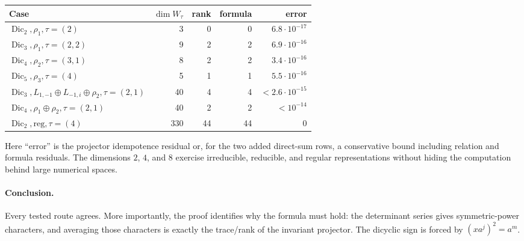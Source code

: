 \documentclass[11pt]{article}
\newcommand{\Dic}{\operatorname{Dic}}
\begin{document}
\begin{center}
\small
\begin{tabular}{@{}lrrrr@{}}
\toprule
Case & $\dim W_\tau$ & rank & formula & error\\
\midrule
$\Dic_2,\rho_1,\tau=(2)$ & 3 & 0 & 0 & $6.8\cdot10^{-17}$\\
$\Dic_3,\rho_1,\tau=(2,2)$ & 9 & 2 & 2 & $6.9\cdot10^{-16}$\\
$\Dic_4,\rho_2,\tau=(3,1)$ & 8 & 2 & 2 & $3.4\cdot10^{-16}$\\
$\Dic_5,\rho_3,\tau=(4)$ & 5 & 1 & 1 & $5.5\cdot10^{-16}$\\
$\Dic_3,L_{1,-1}\oplus L_{-1,i}\oplus\rho_2,\tau=(2,1)$ & 40 & 4 & 4 & $<2.6\cdot10^{-15}$\\
$\Dic_4,\rho_1\oplus\rho_2,\tau=(2,1)$ & 40 & 2 & 2 & $<10^{-14}$\\
$\Dic_2,\mathrm{reg},\tau=(4)$ & 330 & 44 & 44 & $0$\\
\bottomrule
\end{tabular}
\end{center}
Here ``error'' is the projector idempotence residual or, for the two added
direct-sum rows, a conservative bound including relation and formula residuals.
The dimensions $2$, $4$, and $8$ exercise irreducible, reducible, and regular
representations without hiding the computation behind large numerical spaces.

\paragraph{Conclusion.}
Every tested route agrees.  More importantly, the proof identifies why the
formula must hold: the determinant series gives symmetric-power characters,
and averaging those characters is exactly the trace/rank of the invariant
projector.  The dicyclic sign is forced by $(xa^j)^2=a^m$.
\end{document}
